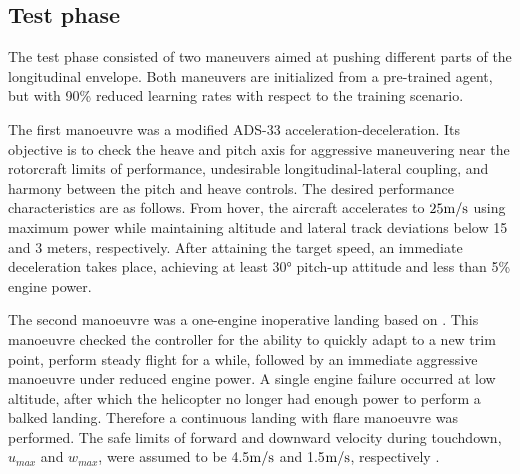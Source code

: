 \subsection{Test phase} \label{ssec:testphase}

The test phase consisted of two maneuvers aimed at pushing different parts of the longitudinal envelope. Both maneuvers are initialized from a pre-trained agent, but with 90\% reduced learning rates with respect to the training scenario. 

The first manoeuvre was a modified ADS-33 \cite{ADS33} acceleration-deceleration. Its objective is to check the heave and pitch axis for aggressive maneuvering near the rotorcraft limits of performance, undesirable longitudinal-lateral coupling, and harmony between the pitch and heave controls. The desired performance characteristics are as follows. From hover, the aircraft accelerates to $25\si[per-mode=symbol]{\meter \per \second}$ using maximum power while maintaining altitude and lateral track deviations below 15 and 3 meters, respectively. After attaining the target speed, an immediate deceleration takes place, achieving at least $30\si{\degree}$ pitch-up attitude and less than 5\% engine power. 

The second manoeuvre was a one-engine inoperative landing based on \cite{Gille2006}. This manoeuvre checked the controller for the ability to quickly adapt to a new trim point, perform steady flight for a while, followed by an immediate aggressive manoeuvre under reduced engine power. A single engine failure occurred at low altitude, after which the helicopter no longer had enough power to perform a balked landing. Therefore a continuous landing with flare manoeuvre was performed. The safe limits of forward and downward velocity during touchdown, $u_{max}$ and $w_{max}$, were assumed to be 4.5$\si[per-mode=symbol]{\meter \per \second}$ and 1.5$\si[per-mode=symbol]{\meter \per \second}$, respectively \cite{OEILandings}.